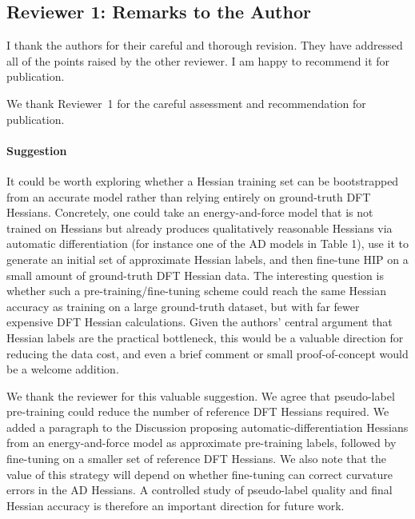 \documentclass[11pt,letterpaper]{article}
\begin{document}
\subsection*{Reviewer 1: Remarks to the Author}

\noindent I thank the authors for their careful and thorough revision. They have addressed all of the points raised by the other reviewer. I am happy to recommend it for publication.

\vspace{1mm}
{\color{responsecolour}
\noindent We thank Reviewer~1 for the careful assessment and recommendation for publication.
}

\paragraph{Suggestion}

\noindent It could be worth exploring whether a Hessian training set can be bootstrapped from an accurate model rather than relying entirely on ground-truth DFT Hessians. Concretely, one could take an energy-and-force model that is not trained on Hessians but already produces qualitatively reasonable Hessians via automatic differentiation (for instance one of the AD models in Table 1), use it to generate an initial set of approximate Hessian labels, and then fine-tune HIP on a small amount of ground-truth DFT Hessian data. The interesting question is whether such a pre-training/fine-tuning scheme could reach the same Hessian accuracy as training on a large ground-truth dataset, but with far fewer expensive DFT Hessian calculations. Given the authors' central argument that Hessian labels are the practical bottleneck, this would be a valuable direction for reducing the data cost, and even a brief comment or small proof-of-concept would be a welcome addition.

\vspace{1mm}
{\color{responsecolour}
\noindent We thank the reviewer for this valuable suggestion. We agree that pseudo-label pre-training could reduce the number of reference DFT Hessians required. We added a paragraph to the Discussion proposing automatic-differentiation Hessians from an energy-and-force model as approximate pre-training labels, followed by fine-tuning on a smaller set of reference DFT Hessians. We also note that the value of this strategy will depend on whether fine-tuning can correct curvature errors in the AD Hessians. A controlled study of pseudo-label quality and final Hessian accuracy is therefore an important direction for future work.
}
\end{document}
